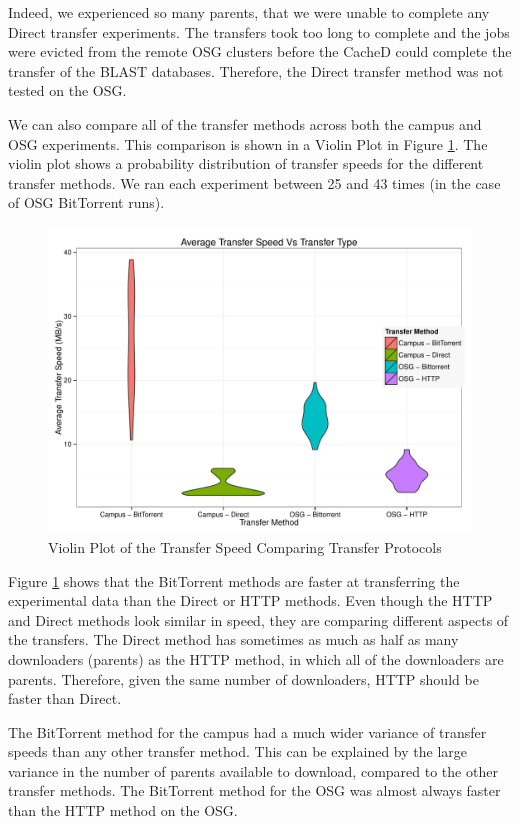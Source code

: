 Indeed, we experienced so many parents, that we were unable to complete any Direct transfer experiments.  The transfers took too long to complete and the jobs were evicted from the remote OSG clusters before the CacheD could complete the transfer of the BLAST databases.  Therefore, the Direct transfer method was not tested on the OSG.

We can also compare all of the transfer methods across both the campus and OSG experiments.  This comparison is shown in a Violin Plot \cite{hintze1998violin} in Figure \ref{fig:violinplots}.  The violin plot shows a probability distribution of transfer speeds for the different transfer methods.  We ran each experiment between 25 and 43 times (in the case of OSG BitTorrent runs).

\begin{figure}[h!t]
\includegraphics[width=\textwidth]{images/ViolinPlot.pdf}
\caption{Violin Plot of the Transfer Speed Comparing Transfer Protocols}
\label{fig:violinplots}
\end{figure}

Figure \ref{fig:violinplots} shows that the BitTorrent methods are faster at transferring the experimental data than the Direct or HTTP methods.  Even though the HTTP and Direct methods look similar in speed, they are comparing different aspects of the transfers.  The Direct method has sometimes as much as half as many downloaders (parents) as the HTTP method, in which all of the downloaders are parents.  Therefore, given the same number of downloaders, HTTP should be faster than Direct.

The BitTorrent method for the campus had a much wider variance of transfer speeds than any other transfer method.  This can be explained by the large variance in the number of parents available to download, compared to the other transfer methods.  The BitTorrent method for the OSG was almost always faster than the HTTP method on the OSG.

